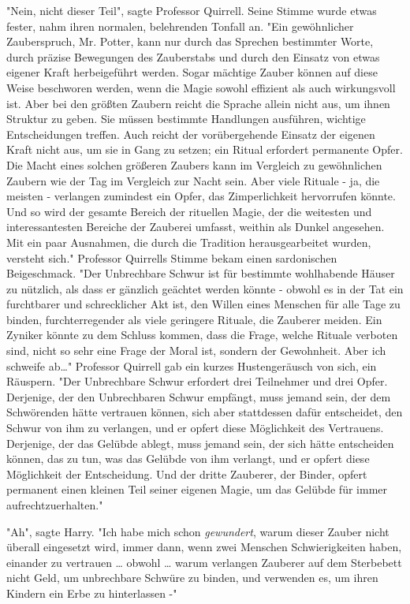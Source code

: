 {"Nein, nicht dieser Teil", sagte Professor Quirrell. Seine Stimme wurde etwas fester, nahm ihren normalen, belehrenden Tonfall an. "Ein gewöhnlicher Zauberspruch, Mr. Potter, kann nur durch das Sprechen bestimmter Worte, durch präzise Bewegungen des Zauberstabs und durch den Einsatz von etwas eigener Kraft herbeigeführt werden. Sogar mächtige Zauber können auf diese Weise beschworen werden, wenn die Magie sowohl effizient als auch wirkungsvoll ist. Aber bei den größten Zaubern reicht die Sprache allein nicht aus, um ihnen Struktur zu geben. Sie müssen bestimmte Handlungen ausführen, wichtige Entscheidungen treffen. Auch reicht der vorübergehende Einsatz der eigenen Kraft nicht aus, um sie in Gang zu setzen; ein Ritual erfordert permanente Opfer. Die Macht eines solchen größeren Zaubers kann im Vergleich zu gewöhnlichen Zaubern wie der Tag im Vergleich zur Nacht sein. Aber viele Rituale - ja, die meisten - verlangen zumindest ein Opfer, das Zimperlichkeit hervorrufen könnte. Und so wird der gesamte Bereich der rituellen Magie, der die weitesten und interessantesten Bereiche der Zauberei umfasst, weithin als Dunkel angesehen. Mit ein paar Ausnahmen, die durch die Tradition herausgearbeitet wurden, versteht sich." Professor Quirrells Stimme bekam einen sardonischen Beigeschmack. "Der Unbrechbare Schwur ist für bestimmte wohlhabende Häuser zu nützlich, als dass er gänzlich geächtet werden könnte - obwohl es in der Tat ein furchtbarer und schrecklicher Akt ist, den Willen eines Menschen für alle Tage zu binden, furchterregender als viele geringere Rituale, die Zauberer meiden. Ein Zyniker könnte zu dem Schluss kommen, dass die Frage, welche Rituale verboten sind, nicht so sehr eine Frage der Moral ist, sondern der Gewohnheit. Aber ich schweife ab…" Professor Quirrell gab ein kurzes Hustengeräusch von sich, ein Räuspern. "Der Unbrechbare Schwur erfordert drei Teilnehmer und drei Opfer. Derjenige, der den Unbrechbaren Schwur empfängt, muss jemand sein, der dem Schwörenden hätte vertrauen können, sich aber stattdessen dafür entscheidet, den Schwur von ihm zu verlangen, und er opfert diese Möglichkeit des Vertrauens. Derjenige, der das Gelübde ablegt, muss jemand sein, der sich hätte entscheiden können, das zu tun, was das Gelübde von ihm verlangt, und er opfert diese Möglichkeit der Entscheidung. Und der dritte Zauberer, der Binder, opfert permanent einen kleinen Teil seiner eigenen Magie, um das Gelübde für immer aufrechtzuerhalten."

"Ah", sagte Harry. "Ich habe mich schon \emph{gewundert}, warum dieser Zauber nicht überall eingesetzt wird, immer dann, wenn zwei Menschen Schwierigkeiten haben, einander zu vertrauen … obwohl … warum verlangen Zauberer auf dem Sterbebett nicht Geld, um unbrechbare Schwüre zu binden, und verwenden es, um ihren Kindern ein Erbe zu hinterlassen -"

}
